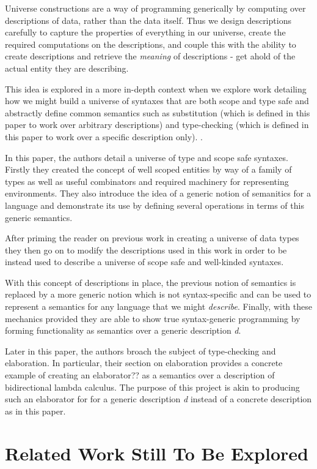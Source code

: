 Universe constructions are a way of programming generically by
computing over descriptions of data, rather than the data itself. Thus
we design descriptions carefully to capture the properties of
everything in our universe, create the required computations on the
descriptions, and couple this with the ability to create descriptions
and retrieve the \emph{meaning} of descriptions - get ahold of
the actual entity they are describing.

This idea is explored in a more in-depth context when we
explore work detailing how we might build a universe of
syntaxes that are both scope and type safe and abstractly
define common semantics such as substitution (which is defined in this
paper to work over arbitrary descriptions) and type-checking (which is
defined in this paper to work over a specific description only).
\cite{DBLP:journals/corr/abs-2001-11001}.

In this paper, the authors detail a universe of type and scope safe
syntaxes. Firstly they created the concept of well scoped entities by
way of a family of types as well as useful combinators and required machinery
for representing environments. They also introduce the idea of a
generic notion of semanitics for a language and demonstrate its use by
defining several operations in terms of this generic semantics.

After priming the reader on previous work in creating a universe of
data types \cite{DBLP:conf/icfp/ChapmanDMM10} they then go on to
modify the descriptions used in this work in order to be instead used
to describe a universe of scope safe and well-kinded syntaxes.

With this concept of descriptions in place, the previous notion of
semantics is replaced by a more generic notion which is not
syntax-specific and can be used to represent a semantics for any
language that we might \emph{describe}. Finally, with these mechanics
provided they are able to show true syntax-generic programming by
forming functionality as semantics over a generic description
\emph{d}.

Later in this paper, the authors broach the subject of type-checking
and elaboration. In particular, their section on elaboration provides
a concrete example of creating an elaborator?? as a semantics over a
description of bidirectional lambda calculus. The purpose of this
project is akin to producing such an elaborator for for a
generic description \emph{d} instead of a concrete description as in
this paper.

\section{Related Work Still To Be Explored}

